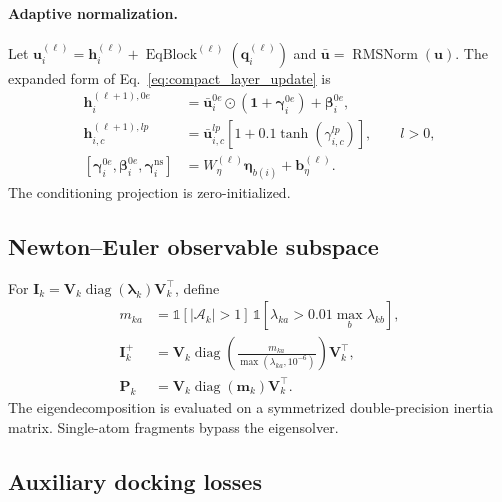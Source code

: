 \paragraph{Adaptive normalization.}
Let
\(\mathbf{u}_i^{(\ell)}
=\mathbf{h}_i^{(\ell)}
+\operatorname{EqBlock}^{(\ell)}(\mathbf{q}_i^{(\ell)})\) and
\(\bar{\mathbf{u}}=\operatorname{RMSNorm}(\mathbf{u})\). The expanded form of
Eq.~\eqref{eq:compact_layer_update} is
\begin{align}
    \mathbf{h}_{i}^{(\ell+1),0e}
    &=
    \bar{\mathbf{u}}_{i}^{0e}
    \odot(\mathbf{1}+\boldsymbol{\gamma}_{i}^{0e})
    +\boldsymbol{\beta}_{i}^{0e},\\
    \mathbf{h}_{i,c}^{(\ell+1),lp}
    &=
    \bar{\mathbf{u}}_{i,c}^{lp}
    \left[1+0.1\tanh(\gamma_{i,c}^{lp})\right],
    \qquad l>0,\\
    [\boldsymbol{\gamma}_{i}^{0e},
      \boldsymbol{\beta}_{i}^{0e},
      \boldsymbol{\gamma}_{i}^{\mathrm{ns}}]
    &=
    W_{\eta}^{(\ell)}\boldsymbol{\eta}_{b(i)}
    +\mathbf{b}_{\eta}^{(\ell)}.
    \label{eq:equivariant_adaln}
\end{align}
The conditioning projection is zero-initialized.

\subsection{Newton--Euler observable subspace}
\label{app:newton_euler_details}

For
\(\mathbf{I}_k=\mathbf{V}_k
\operatorname{diag}(\boldsymbol{\lambda}_k)\mathbf{V}_k^\top\), define
\begin{align}
    m_{ka}
    &=
    \mathbb{1}[|\mathcal{A}_k|>1]\,
    \mathbb{1}
    \left[
      \lambda_{ka}>0.01\max_b\lambda_{kb}
    \right],\\
    \mathbf{I}_k^{+}
    &=
    \mathbf{V}_k
    \operatorname{diag}
    \left(
      \frac{m_{ka}}{\max(\lambda_{ka},10^{-6})}
    \right)
    \mathbf{V}_k^\top,\\
    \mathbf{P}_k
    &=
    \mathbf{V}_k\operatorname{diag}(\mathbf{m}_k)\mathbf{V}_k^\top.
    \label{eq:observable_projection}
\end{align}
The eigendecomposition is evaluated on a symmetrized double-precision inertia
matrix. Single-atom fragments bypass the eigensolver.

\subsection{Auxiliary docking losses}
\label{app:loss_details}

